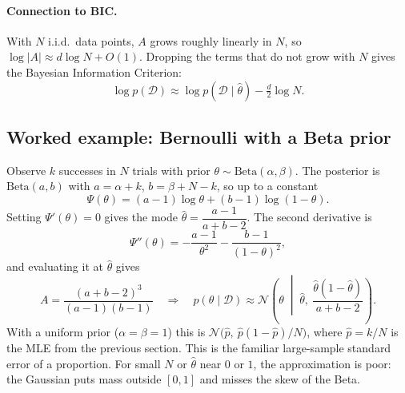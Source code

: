 \documentclass[11pt]{article}
\begin{document}
\paragraph{Connection to BIC.} With $N$ i.i.d.\ data points, $A$ grows roughly linearly in $N$, so $\log|A| \approx d \log N + O(1)$. Dropping the terms that do not grow with $N$ gives the Bayesian Information Criterion:
\begin{equation}
    \log p(\mathcal{D}) \approx \log p(\mathcal{D} \mid \hat\theta) - \tfrac{d}{2} \log N .
\end{equation}

\subsection{Worked example: Bernoulli with a Beta prior}
Observe $k$ successes in $N$ trials with prior $\theta \sim \mathrm{Beta}(\alpha, \beta)$. The posterior is $\mathrm{Beta}(a, b)$ with $a = \alpha + k$, $b = \beta + N - k$, so up to a constant
\begin{equation}
    \Psi(\theta) = (a-1)\log\theta + (b-1)\log(1-\theta).
\end{equation}
Setting $\Psi'(\theta) = 0$ gives the mode $\hat\theta = \dfrac{a-1}{a+b-2}$. The second derivative is
\begin{equation}
    \Psi''(\theta) = -\frac{a-1}{\theta^2} - \frac{b-1}{(1-\theta)^2},
\end{equation}
and evaluating it at $\hat\theta$ gives
\begin{equation}
    A = \frac{(a+b-2)^3}{(a-1)(b-1)} \quad\Longrightarrow\quad
    p(\theta \mid \mathcal{D}) \approx \mathcal{N}\!\left(\theta \;\middle|\; \hat\theta,\ \frac{\hat\theta(1-\hat\theta)}{a+b-2}\right).
\end{equation}
With a uniform prior ($\alpha = \beta = 1$) this is $\mathcal{N}\big(\hat p,\ \hat p(1-\hat p)/N\big)$, where $\hat p = k/N$ is the MLE from the previous section. This is the familiar large-sample standard error of a proportion. For small $N$ or $\hat\theta$ near $0$ or $1$, the approximation is poor: the Gaussian puts mass outside $[0,1]$ and misses the skew of the Beta.
\end{document}

